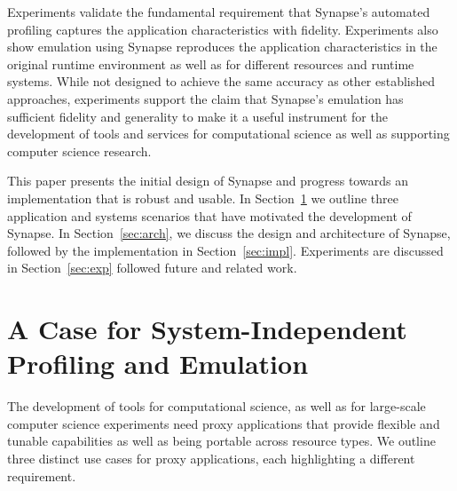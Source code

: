 \documentclass[10pt, conference, compsocconf]{IEEEtran}
\newcommand{\synapse}{Synapse\xspace}
\begin{document}
Experiments validate the fundamental requirement that \synapse's
automated profiling captures the application characteristics with fidelity.
Experiments also show emulation using \synapse reproduces the application
characteristics in the original runtime environment as well as for different
resources and runtime systems.  While not designed to achieve the same accuracy
as other established approaches, experiments support the claim that \synapse's
emulation has sufficient fidelity and generality to make it a useful instrument
for the development of tools and services for computational science as well as
supporting computer science research.

This paper presents the initial design of \synapse and progress towards an
implementation that is robust and usable. In Section~\ref{sec:overview} we
outline three application and systems scenarios that have motivated the
development of \synapse. In Section~\ref{sec:arch}, we discuss the design and
architecture of \synapse, followed by the implementation in
Section~\ref{sec:impl}. Experiments are discussed in 
Section~\ref{sec:exp} followed future and related work.







\section{A Case for System-Independent Profiling and Emulation}
\label{sec:overview}

The development of tools for computational science, as well as for large-scale
computer science experiments need proxy applications that provide flexible and
tunable capabilities as well as being portable across resource types. We outline
three distinct use cases for proxy applications, each highlighting a different
requirement.
\end{document}
